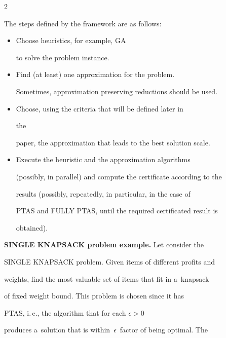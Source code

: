 \begin{multicols}{2}





The steps defined by the framework are as follows:


\begin{itemize}


\item Choose heuristics, for example, GA


to solve the problem instance.


\item Find (at least) one approximation for the problem.


Sometimes, approximation preserving reductions should be used.


\item Choose, using the criteria that will be defined later in


the


paper, the approximation that leads to the best solution scale.


\item Execute the heuristic and the approximation algorithms


(possibly, in parallel) and compute the certificate according to the


results (possibly, repeatedly, in particular, in the case of


PTAS and {FULLY PTAS}, until the required certificated result is


obtained).


\end{itemize}





\noindent


\textbf{SINGLE KNAPSACK problem example.} Let consider the


{SINGLE KNAPSACK} problem. Given items of different profits and


weights, find the most valuable set of items that fit in a~knapsack


of fixed weight bound. This problem is chosen since it has


PTAS, i.\,e., the algorithm that for each $\epsilon > 0$


produces a~solution that is within~$\epsilon$~factor of being optimal. The



\end{multicols}

